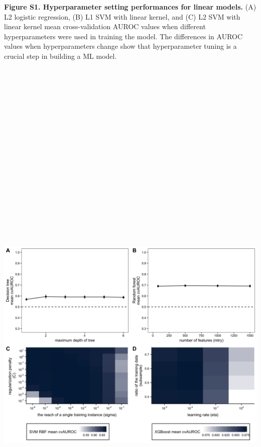 \documentclass[11pt,]{article}
\begin{document}
\textbf{Figure S1. Hyperparameter setting performances for linear
models.} (A) L2 logistic regression, (B) L1 SVM with linear kernel, and
(C) L2 SVM with linear kernel mean cross-validation AUROC values when
different hyperparameters were used in training the model. The
differences in AUROC values when hyperparameters change show that
hyperparameter tuning is a crucial step in building a ML model.

\newpage

\includegraphics[height=30cm, width=15cm]{Figure_S2.png}
\end{document}
